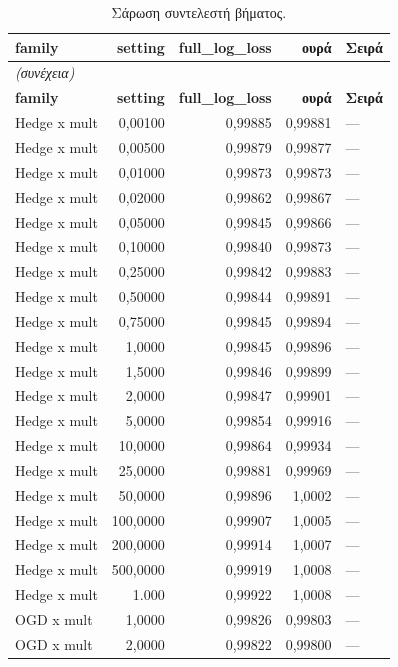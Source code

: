 {\footnotesize
\begin{longtable}{@{}lrrrl@{}}
\caption{Σάρωση συντελεστή βήματος.}\label{app:lr}\\
\toprule \textbf{family} & \textbf{setting} & \textbf{full\_log\_loss} & \textbf{ουρά} & \textbf{Σειρά} \\\midrule\endfirsthead
\multicolumn{5}{l}{\emph{(συνέχεια)}}\\\toprule \textbf{family} & \textbf{setting} & \textbf{full\_log\_loss} & \textbf{ουρά} & \textbf{Σειρά} \\\midrule\endhead
\bottomrule\endfoot
Hedge x mult & 0,00100 & 0,99885 & 0,99881 & --- \\
Hedge x mult & 0,00500 & 0,99879 & 0,99877 & --- \\
Hedge x mult & 0,01000 & 0,99873 & 0,99873 & --- \\
Hedge x mult & 0,02000 & 0,99862 & 0,99867 & --- \\
Hedge x mult & 0,05000 & 0,99845 & 0,99866 & --- \\
Hedge x mult & 0,10000 & 0,99840 & 0,99873 & --- \\
Hedge x mult & 0,25000 & 0,99842 & 0,99883 & --- \\
Hedge x mult & 0,50000 & 0,99844 & 0,99891 & --- \\
Hedge x mult & 0,75000 & 0,99845 & 0,99894 & --- \\
Hedge x mult & 1,0000 & 0,99845 & 0,99896 & --- \\
Hedge x mult & 1,5000 & 0,99846 & 0,99899 & --- \\
Hedge x mult & 2,0000 & 0,99847 & 0,99901 & --- \\
Hedge x mult & 5,0000 & 0,99854 & 0,99916 & --- \\
Hedge x mult & 10,0000 & 0,99864 & 0,99934 & --- \\
Hedge x mult & 25,0000 & 0,99881 & 0,99969 & --- \\
Hedge x mult & 50,0000 & 0,99896 & 1,0002 & --- \\
Hedge x mult & 100,0000 & 0,99907 & 1,0005 & --- \\
Hedge x mult & 200,0000 & 0,99914 & 1,0007 & --- \\
Hedge x mult & 500,0000 & 0,99919 & 1,0008 & --- \\
Hedge x mult & 1.000 & 0,99922 & 1,0008 & --- \\
OGD x mult & 1,0000 & 0,99826 & 0,99803 & --- \\
OGD x mult & 2,0000 & 0,99822 & 0,99800 & --- \\

\end{longtable}}
